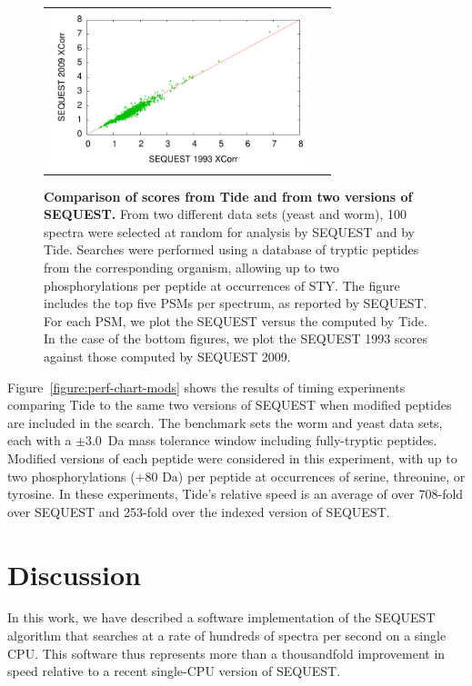 \begin{figure}
\begin{tabular}{cc}
\includegraphics[width=3in]{xcorr_xcorr_worm_seqorig_seqrecent.pdf} \\
\end{tabular}
\caption[Comparison of \XCorr scores from Tide and from two versions of
  SEQUEST]{{\bf Comparison of \XCorr scores from Tide and from two versions of
    SEQUEST.}  From two different data sets (yeast and worm), 100 spectra were
  selected at random for analysis by SEQUEST and by Tide.  Searches were
  performed using a database of tryptic peptides from the corresponding
  organism, allowing up to two phosphorylations per peptide at occurrences of
  STY. The figure includes the top five PSMs per spectrum, as reported by
  SEQUEST.  For each PSM, we plot the SEQUEST \XCorr versus the \XCorr computed
  by Tide. In the case of the bottom figures, we plot the SEQUEST 1993 \XCorr
  scores against those computed by SEQUEST 2009.
  \label{figure:scatter}}
\end{figure}

Figure~\ref{figure:perf-chart-mods} shows the results of timing
experiments comparing Tide to the same two versions of SEQUEST when
modified peptides are included in the search. The
benchmark sets the worm and yeast data sets, each with
a $\pm 3.0$~Da mass tolerance window including fully-tryptic
peptides. Modified versions of each peptide were considered in this
experiment, with up to two phosphorylations ($+80$ Da) per peptide at
occurrences of serine, threonine, or tyrosine. In these experiments,
Tide's relative speed is an average of over 708-fold over SEQUEST and
253-fold over the indexed version of SEQUEST.

\section{Discussion}

In this work, we have described a software implementation of the
SEQUEST algorithm that searches at a rate of hundreds of spectra per
second on a single CPU.  This software thus represents more than a
thousandfold improvement in speed relative to a recent single-CPU
version of SEQUEST.


